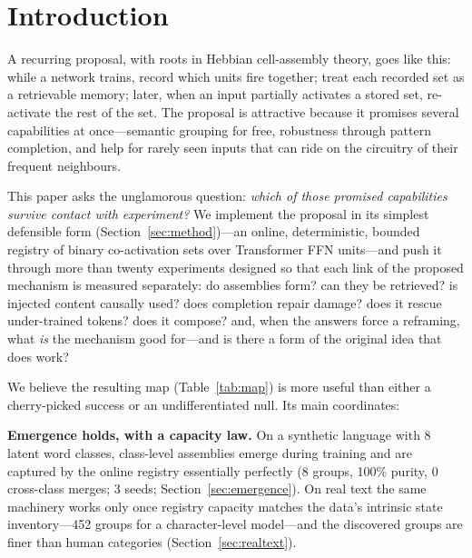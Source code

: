 \documentclass[11pt]{article}
\begin{document}
\section{Introduction}
\label{sec:intro}

A recurring proposal, with roots in Hebbian cell-assembly theory, goes like
this: while a network trains, record which units fire together; treat each
recorded set as a retrievable memory; later, when an input partially activates a
stored set, re-activate the rest of the set. The proposal is attractive because
it promises several capabilities at once---semantic grouping for free,
robustness through pattern completion, and help for rarely seen inputs that can
ride on the circuitry of their frequent neighbours.

This paper asks the unglamorous question: \emph{which of those promised
capabilities survive contact with experiment?} We implement the proposal in its
simplest defensible form (Section~\ref{sec:method})---an online, deterministic,
bounded registry of binary co-activation sets over Transformer FFN units---and
push it through more than twenty experiments designed so that each link of the
proposed mechanism is measured separately: do assemblies form? can they be
retrieved? is injected content causally used? does completion repair damage?
does it rescue under-trained tokens? does it compose? and, when the answers
force a reframing, what \emph{is} the mechanism good for---and is there a
form of the original idea that does work?

We believe the resulting map (Table~\ref{tab:map}) is more useful than either a
cherry-picked success or an undifferentiated null. Its main coordinates:

\textbf{Emergence holds, with a capacity law.} On a synthetic language with 8
latent word classes, class-level assemblies emerge during training and are
captured by the online registry essentially perfectly (8 groups, 100\% purity,
0 cross-class merges; 3 seeds; Section~\ref{sec:emergence}). On real text the
same machinery works only once registry capacity matches the data's intrinsic
state inventory---452 groups for a character-level model---and the
discovered groups are finer than human categories
(Section~\ref{sec:realtext}).
\end{document}
